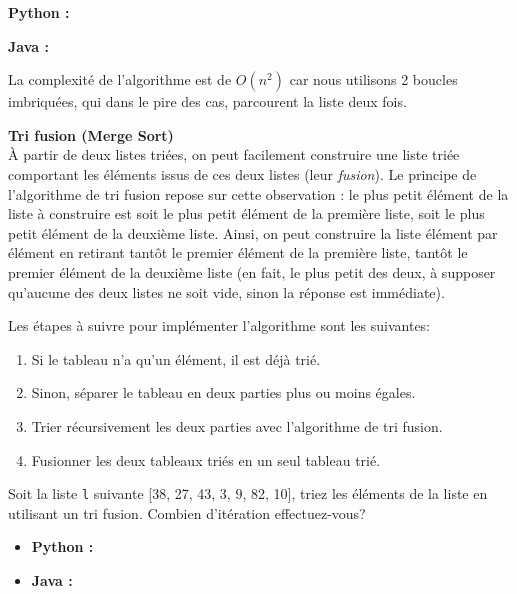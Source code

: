 \begin{Exercice} [20 minutes]
    \begin{solution}
        \textbf{Python :}
             
        \textbf{Java :}
            
    
    La complexité de l'algorithme est de $O(n^2)$ car nous utilisons 2 boucles imbriquées, qui dans le pire des cas, parcourent la liste deux fois.
    \end{solution}
    
\end{Exercice}

\begin{Exercice} [30 minutes] \textbf{Tri fusion (Merge Sort)} \\
    À partir de deux listes triées, on peut facilement construire une liste triée comportant les éléments issus de ces deux listes (leur \textit{fusion}). Le principe de l'algorithme de tri fusion repose sur cette observation : le plus petit élément de la liste à construire est soit le plus petit élément de la première liste, soit le plus petit élément de la deuxième liste. Ainsi, on peut construire la liste élément par élément en retirant tantôt le premier élément de la première liste, tantôt le premier élément de la deuxième liste (en fait, le plus petit des deux, à supposer qu'aucune des deux listes ne soit vide, sinon la réponse est immédiate). 
    
    Les étapes à suivre pour implémenter l'algorithme sont les suivantes:
    \begin{enumerate}
        \item Si le tableau n'a qu'un élément, il est déjà trié.
        \item Sinon, séparer le tableau en deux parties plus ou moins égales.
        \item Trier récursivement les deux parties avec l'algorithme de tri fusion.
        \item Fusionner les deux tableaux triés en un seul tableau trié.
    \end{enumerate}
    
    Soit la liste \lstinline{l} suivante [38, 27, 43, 3, 9, 82, 10], triez les éléments de la liste en utilisant un tri fusion. Combien d'itération effectuez-vous?
    
    \begin{itemize}
        \item \textbf{Python :}
            
        \item \textbf{Java :}
            
    \end{itemize}
    

\end{Exercice}
